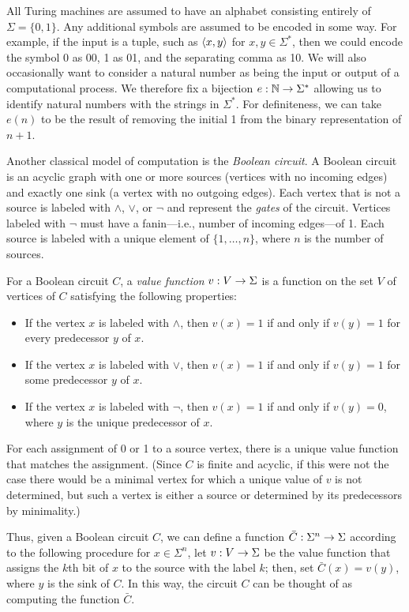 All Turing machines are assumed to have an alphabet consisting entirely of
$\Sigma=\{0,1\}$. Any additional symbols are assumed to be encoded in some
way. For example, if the input is a tuple, such as $\left\langle x,y\right\rangle$ for
$x,y\in\Sigma^*$, then we could encode the symbol 0 as 00, 1 as 01, and the
separating comma as 10. We will also occasionally want to consider a natural
number as being the input or output of a computational process. We therefore fix
a bijection $e:\mathbb{N}\rightarrow\Sigma^*$ allowing us to identify natural numbers with the
strings in $\Sigma^*$. For definiteness, we can take $e(n)$ to be the result of
removing the initial 1 from the binary representation of $n+1$.

Another classical model of computation is the \textit{Boolean circuit}. A
Boolean circuit is an acyclic graph with one or more sources (vertices with no
incoming edges) and exactly one sink (a vertex with no outgoing edges). Each
vertex that is not a source is labeled with $\wedge$, $\vee$, or
$\neg$ and represent the \textit{gates} of the circuit. Vertices labeled with 
$\neg$ must have a fanin---i.e., number of
incoming edges---of 1. Each source is labeled with a unique element of
$\{1,\ldots,n\}$, where $n$ is the number of sources.

For a Boolean circuit $C$, a \textit{value function} $v:V\rightarrow\Sigma$ is a
function on the set $V$ of vertices of $C$ satisfying the following properties:
\begin{itemize}
\item If the vertex $x$ is labeled with $\wedge$, then $v(x)=1$ if and only if
  $v(y)=1$ for every predecessor $y$ of $x$.
\item If the vertex $x$ is labeled with $\vee$, then $v(x)=1$ if and only if
  $v(y)=1$ for some predecessor $y$ of $x$.
\item If the vertex $x$ is labeled with $\neg$, then $v(x)=1$ if and only if
  $v(y)=0$, where $y$ is the unique predecessor of $x$.
\end{itemize}
For each assignment of 0 or 1 to a source vertex, there is a unique value
function that matches the assignment. (Since $C$ is finite and acyclic, if this
were not the case there would be a minimal vertex for which a unique value of
$v$ is not determined, but such a vertex is either a source or determined by its
predecessors by minimality.)

Thus, given a Boolean circuit $C$, we can define a function $\bar
C:\Sigma^n\rightarrow\Sigma$ according to the following procedure for $x\in\Sigma^n$,
let $v:V\rightarrow\Sigma$ be the value function that assigns the $k$th bit of $x$ to
the source with the label $k$; then, set $\bar C(x)=v(y)$, where $y$ is the sink
of $C$. In this way, the circuit $C$ can be thought of as computing the function
$\bar C$.

